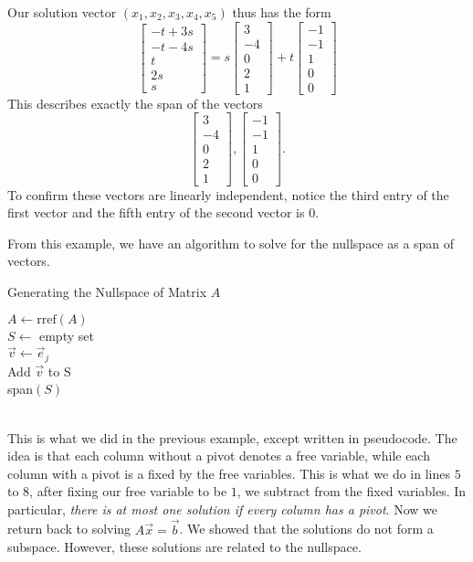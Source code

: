 Our solution vector $(x_1,x_2,x_3,x_4,x_5)$ thus has the form \[
\begin{bmatrix}
	-t+3s\\ -t-4s\\ t\\ 2s\\ s
\end{bmatrix}= s\begin{bmatrix}
	3 \\ -4 \\ 0 \\ 2 \\ 1
\end{bmatrix} + t \begin{bmatrix}
	-1 \\ -1 \\ 1 \\0 \\0
\end{bmatrix}
\]
This describes exactly the span of the vectors \[
	\begin{bmatrix}
		3 \\ -4 \\ 0 \\ 2 \\ 1
	\end{bmatrix} ,
	\begin{bmatrix}
		-1 \\ -1 \\ 1 \\0 \\0
	\end{bmatrix}.
\]
To confirm these vectors are linearly independent, notice the third entry of the first vector and the fifth entry of the second vector is $0$.

From this example, we have an algorithm to solve for the nullspace as a span of vectors.
\begin{algorithm}
\caption{Generating the Nullspace of Matrix $A$}

	$A\gets \textrm{rref}(A)$\\
	 $S\gets$ empty set\\
	 {
		 $\vec{v} \gets \vec{e}_j$\\
		Add $\vec{v}$ to S\\
	 }
	\Return span$(S)$
\end{algorithm}
\\
This is what we did in the previous example, except written in pseudocode.
The idea is that each column without a pivot denotes a free variable, while each column with a pivot is a fixed by the free variables.
This is what we do in lines $5$ to $8$, after fixing our free variable to be $1$, we subtract from the fixed variables. 
In particular,\textit{ there is at most one solution if every column has a pivot}.
Now we return back to solving $A\vec{x}=\vec{b}$. We showed that the solutions do not form a subspace. However, these solutions are related to the nullspace.


